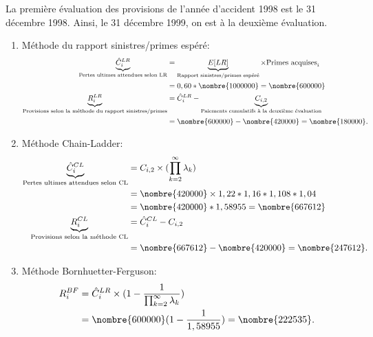\begin{exemple}
  La première évaluation des provisions de l'année d'accident 1998 est
  le 31 décembre 1998. Ainsi, le 31 décembre 1999, on est à la
  deuxième évaluation.
  \begin{enumerate}
  \item Méthode du rapport sinistres/primes espéré:
    \begin{align*}
      \underbrace{\hat{C}_{i}^{LR}}_{\text{Pertes ultimes attendues selon LR}} &=
                                                                                 \underbrace{\Esp{LR}}_{\text{Rapport sinistres/primes espéré}} \times \text{Primes acquises}_i\\
                                                                               &= 0,60 * \nombre{1000000} = \nombre{600000} \\
      \underbrace{R_i^{LR}}_{\text{Provisions selon la méthode du rapport sinistres/primes}}
                                                                               &= \hat{C}_{i}^{LR} - \underbrace{C_{i, 2}}_{\text{Paiements cumulatifs à la deuxième évaluation}} \\
                                                                               &= \nombre{600000} - \nombre{420000} = \nombre{180000}.
    \end{align*}
  \item Méthode Chain-Ladder:
    \begin{align*}
      \underbrace{\hat{C}_{i}^{CL}}_{\text{Pertes ultimes attendues selon CL}} &=
                                                                                 C_{i, 2} \times (\prod_{k=2}^{\infty} \lambda_k)\\
                                                                               &= \nombre{420000} \times 1,22 * 1,16 * 1,108 * 1,04 \\
                                                                               &= \nombre{420000} * 1,58955 = \nombre{667612}\\
      \underbrace{R_i^{CL}}_{\text{Provisions selon la méthode CL}}
                                                                               &= \hat{C}_{i}^{CL} - C_{i, 2} \\
                                                                               &= \nombre{667612} - \nombre{420000} = \nombre{247612}.
    \end{align*}
  \item Méthode Bornhuetter-Ferguson:
    \begin{align*}
      R_i^{BF} &= \hat{C}_{i}^{LR} \times ( 1 - \frac{1}{\prod_{k=2}^{\infty} \lambda_k}) \\
               &= \nombre{600000} (1-\frac{1}{1,58955}) = \nombre{222535}.
    \end{align*}


\end{enumerate}
\end{exemple}
